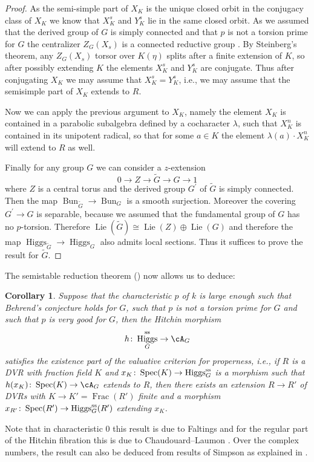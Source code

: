 \documentclass[a4paper]{amsart}
\numberwithin{equation}{section}
\theoremstyle{plain}
\newtheorem{cor}[thm]{Corollary}
\theoremstyle{definition}
\DeclareMathOperator{\Spec}{Spec}
\DeclareMathOperator{\Frac}{Frac}
\DeclareMathOperator{\Bun}{Bun}
\newcommand{\co}{\colon}
\renewcommand{\ss}{{\rm ss}}
\DeclareMathOperator{\Lie}{Lie}
\DeclareMathOperator{\Higgs}{Higgs}
\begin{document}
\begin{proof}
	As the semi-simple part of $X_K$ is the unique closed orbit in the conjugacy class of $X_K$ we know that $X_K^s$ and $Y_K^s$ lie in the same closed orbit. As we assumed that the derived group of $G$ is simply connected and that $p$ is not a torsion prime for $G$ the centralizer $Z_G(X_s)$ is a connected reductive group \cite[Thm.~0.1]{SteinbergTorsion}. By Steinberg's theorem, any $Z_G(X_s)$ torsor over $K(\eta)$ splits after a finite extension of $K$, so after possibly extending $K$ the elements $X_K^s$ and $Y_K^s$ are conjugate. Thus after conjugating $X_K$ we may assume that $X_K^s=Y_K^s$, i.e., we may assume that the semisimple part of $X_K$ extends to $R$.
	
	Now we can apply the previous argument to $X_K$, namely the element $X_K$ is contained in a parabolic subalgebra defined by a cocharacter $\lambda$, such that $X_K^n$ is contained in its unipotent radical, so that for some $a\in K$ the element $\lambda(a)\cdot X_K^n$ will extend to $R$ as well.
	
	Finally for any group $G$ we can consider a $z$-extension $$0 \to Z \to \widetilde{G} \to G \to 1$$  where $Z$ is a central torus and the derived group $G^\prime$ of $\widetilde{G}$ is simply connected. Then the map $\Bun_{\widetilde{G}} \to \Bun_G$ is a smooth surjection. Moreover the covering $G^\prime \to G$ is separable, because we assumed that the fundamental group of $G$ has no $p$-torsion. Therefore $\Lie(\widetilde{G})  \cong \Lie(Z) \oplus \Lie(G)$ and therefore the map $\Higgs_{\widetilde{G}}\to \Higgs_G$ also admits local sections. Thus it suffices to prove the result for $\widetilde{G}$.
\end{proof}

The semistable reduction theorem () now allows us to deduce:

\begin{cor} \label{C:higgs_properness}
	Suppose that the characteristic $p$ of $k$ is large enough such that Behrend's conjecture holds for $G$, such that $p$ is not a torsion prime for $G$ and such that $p$ is very good for $G$, then the Hitchin morphism
	$$ h \co \Higgs_G^{\ss} \to \cA_G$$
	satisfies the existence part of the valuative criterion for properness, i.e., if $R$ is a DVR with fraction field $K$ and 
	$x_K\co \Spec(K) \to \Higgs_G^{\ss}$ is a morphism such that $h(x_K)\co \Spec(K) \to \cA_G$ extends to $R$, then there exists an extension $R \to R'$ of DVRs with $K \to K'=\Frac(R')$ finite	
	and a morphism $x_{R^\prime} \co \Spec(R') \to \Higgs^{\ss}_G(R^\prime)$ extending $x_K$. 
\end{cor}
Note that in characteristic $0$ this result is due to Faltings \cite[Thm.~II.4]{FaltingsStableG} and for the regular part of the Hitchin fibration this is due to Chaudouard--Laumon \cite[Thm.~8.1.1]{ChaudouardLaumonLFP1}. Over the complex numbers, the result can also be deduced from results of Simpson as explained in \cite{deCataldo}.
\end{document}
